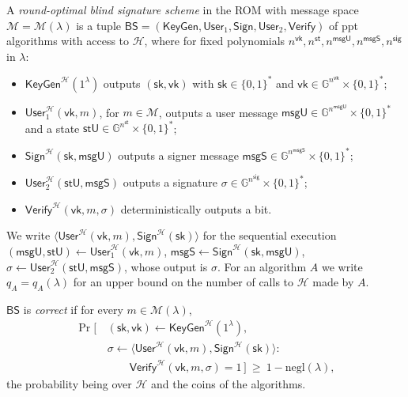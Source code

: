 \documentclass{aicr-conjecture}
\newcommand{\GG}{\mathbb{G}}
\newcommand{\MM}{\mathcal{M}}
\newcommand{\HH}{\mathcal{H}}
\newcommand{\negl}{\mathrm{negl}}
\newcommand{\BS}{\mathsf{BS}}
\newcommand{\KeyGen}{\mathsf{KeyGen}}
\newcommand{\Userone}{\mathsf{User}_1}
\newcommand{\Usertwo}{\mathsf{User}_2}
\newcommand{\Usr}{\mathsf{User}}
\newcommand{\Sig}{\mathsf{Sign}}
\newcommand{\Ver}{\mathsf{Verify}}
\newcommand{\sky}{\mathsf{sk}}
\newcommand{\vky}{\mathsf{vk}}
\newcommand{\stU}{\mathsf{stU}}
\newcommand{\msgU}{\mathsf{msgU}}
\newcommand{\msgS}{\mathsf{msgS}}
\begin{document}
\begin{definition}
\label{def:bs}
A \emph{round-optimal blind signature scheme} in the ROM with message
space $\MM=\MM(\lambda)$ is a tuple
$\BS=(\KeyGen,\Userone,\Sig,\Usertwo,\Ver)$ of ppt algorithms with
access to $\HH$, where for fixed polynomials
$n^{\mathsf{vk}},n^{\mathsf{st}},n^{\mathsf{msgU}},n^{\mathsf{msgS}},
n^{\mathsf{sig}}$ in $\lambda$:
\begin{itemize}
  \item $\KeyGen^{\HH}(1^{\lambda})$ outputs $(\sky,\vky)$ with
    $\sky\in\{0,1\}^{*}$ and
    $\vky\in\GG^{n^{\mathsf{vk}}}\times\{0,1\}^{*}$;
  \item $\Userone^{\HH}(\vky,m)$, for $m\in\MM$, outputs a user message
    $\msgU\in\GG^{n^{\mathsf{msgU}}}\times\{0,1\}^{*}$ and a state
    $\stU\in\GG^{n^{\mathsf{st}}}\times\{0,1\}^{*}$;
  \item $\Sig^{\HH}(\sky,\msgU)$ outputs a signer message
    $\msgS\in\GG^{n^{\mathsf{msgS}}}\times\{0,1\}^{*}$;
  \item $\Usertwo^{\HH}(\stU,\msgS)$ outputs a signature
    $\sigma\in\GG^{n^{\mathsf{sig}}}\times\{0,1\}^{*}$;
  \item $\Ver^{\HH}(\vky,m,\sigma)$ deterministically outputs a bit.
\end{itemize}
We write $\langle\Usr^{\HH}(\vky,m),\Sig^{\HH}(\sky)\rangle$ for the
sequential execution
$(\msgU,\stU)\leftarrow\Userone^{\HH}(\vky,m)$,
$\msgS\leftarrow\Sig^{\HH}(\sky,\msgU)$,
$\sigma\leftarrow\Usertwo^{\HH}(\stU,\msgS)$, whose output is $\sigma$.
For an algorithm $A$ we write $q_{A}=q_{A}(\lambda)$ for an upper bound
on the number of calls to $\HH$ made by $A$.

$\BS$ is \emph{correct} if for every $m\in\MM(\lambda)$,
\begin{align*}
\Pr\bigl[\,
  &(\sky,\vky)\leftarrow\KeyGen^{\HH}(1^{\lambda}),\\
  &\sigma\leftarrow\langle\Usr^{\HH}(\vky,m),\Sig^{\HH}(\sky)\rangle:\\
  &\qquad \Ver^{\HH}(\vky,m,\sigma)=1\,\bigr]
   \ \ge\ 1-\negl(\lambda),
\end{align*}
the probability being over $\HH$ and the coins of the algorithms.
\end{definition}
\end{document}
